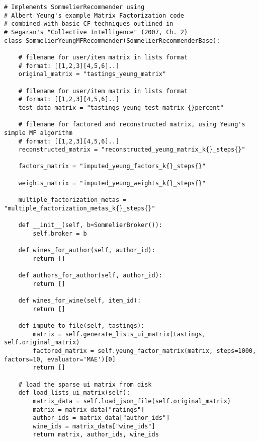 \begin{verbatim}
# Implements SommelierRecommender using
# Albert Yeung's example Matrix Factorization code
# combined with basic CF techniques outlined in
# Segaran's "Collective Intelligence" (2007, Ch. 2)
class SommelierYeungMFRecommender(SommelierRecommenderBase):

    # filename for user/item matrix in lists format
    # format: [[1,2,3][4,5,6]..]
    original_matrix = "tastings_yeung_matrix"

    # filename for user/item matrix in lists format
    # format: [[1,2,3][4,5,6]..]
    test_data_matrix = "tastings_yeung_test_matrix_{}percent"

    # filename for factored and reconstructed matrix, using Yeung's simple MF algorithm
    # format: [[1,2,3][4,5,6]..]
    reconstructed_matrix = "reconstructed_yeung_matrix_k{}_steps{}"

    factors_matrix = "imputed_yeung_factors_k{}_steps{}"

    weights_matrix = "imputed_yeung_weights_k{}_steps{}"   

    multiple_factorization_metas = "multiple_factorization_metas_k{}_steps{}"   

    def __init__(self, b=SommelierBroker()):
        self.broker = b

    def wines_for_author(self, author_id):
        return []

    def authors_for_author(self, author_id):
        return []

    def wines_for_wine(self, item_id):
        return []

    def impute_to_file(self, tastings):
        matrix = self.generate_lists_ui_matrix(tastings, self.original_matrix)
        factored_matrix = self.yeung_factor_matrix(matrix, steps=1000, factors=10, evaluator='MAE')[0]
        return []

    # load the sparse ui matrix from disk
    def load_lists_ui_matrix(self):
        matrix_data = self.load_json_file(self.original_matrix)
        matrix = matrix_data["ratings"]
        author_ids = matrix_data["author_ids"]
        wine_ids = matrix_data["wine_ids"]
        return matrix, author_ids, wine_ids


\end{verbatim}
